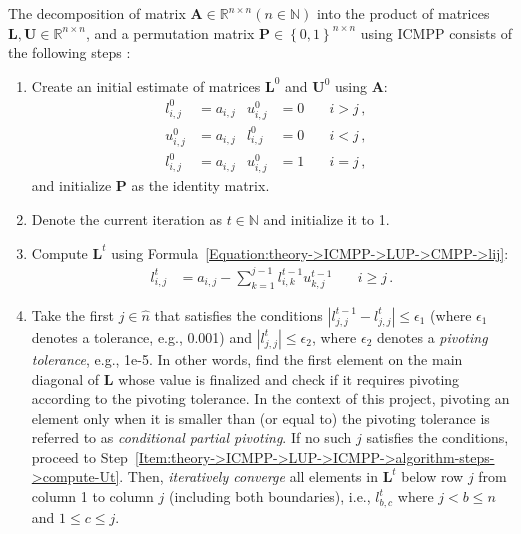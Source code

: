 The decomposition of matrix $\mathbf{A} \in \mathbb{R}^{n \times n} \left(n \in \mathbb{N}\right)$ into the product of matrices $\mathbf{L}, \mathbf{U} \in \mathbb{R}^{n \times n}$, and a permutation matrix $\mathbf{P} \in \left\{0,1\right\}^{n \times n}$ using ICMPP consists of the following steps \cite{Cejka2022}:

\begin{enumerate}
	\item Create an initial estimate of matrices $\mathbf{L}^{0}$ and $\mathbf{U}^{0}$ using $\mathbf{A}$:
		\begin{align}
			l_{i,j}^{0} & = a_{i,j} & u_{i,j}^{0} & = 0 \quad & i > j \nonumber\,, &  \\
			u_{i,j}^{0} & = a_{i,j} & l_{i,j}^{0} & = 0 \quad & i < j \nonumber\,, &  \\
			l_{i,j}^{0} & = a_{i,j} & u_{i,j}^{0} & = 1       & i = j \nonumber\,, &
		\end{align}
		and initialize $\mathbf{P}$ as the identity matrix.
	\item Denote the current iteration as $t \in \mathbb{N}$ and initialize it to 1.
	\item \label{Item:theory->ICMPP->LUP->ICMPP->algorithm-steps->compute-Lt}
		Compute $\mathbf{L}^{t}$ using Formula~\ref{Equation:theory->ICMPP->LUP->CMPP->lij}:
		\begin{align}
			l_{i,j}^{t} &= a_{i,j} - \sum_{k=1}^{j-1}l_{i,k}^{t-1}u_{k,j}^{t-1} &\quad i \geq j \nonumber\,.
		\end{align}
	\item \label{Item:theory->ICMPP->LUP->ICMPP->algorithm-steps->converge-lower-sections}
		Take the first $j \in \widehat{n}$ that satisfies the conditions $\left|l^{t-1}_{j, j} - l^{t}_{j, j}\right| \leq \epsilon_1$ (where $\epsilon_1$ denotes a tolerance, e.g., 0.001) and $\left|l^{t}_{j, j}\right| \leq \epsilon_2$, where $\epsilon_2$ denotes a \textit{pivoting tolerance}, e.g., 1e-5.
		In other words, find the first element on the main diagonal of $\mathbf{L}$ whose value is finalized and check if it requires pivoting according to the pivoting tolerance.
		In the context of this project, pivoting an element only when it is smaller than (or equal to) the pivoting tolerance is referred to as \textit{conditional partial pivoting}.
		If no such $j$ satisfies the conditions, proceed to Step~\ref{Item:theory->ICMPP->LUP->ICMPP->algorithm-steps->compute-Ut}.
		Then, \textit{iteratively converge} all elements in $\mathbf{L}^{t}$ below row $j$ from column 1 to column $j$ (including both boundaries), i.e., $l^{t}_{b, c}$ where $j < b \leq n$ and $1 \leq c \leq j$.

\end{enumerate}
